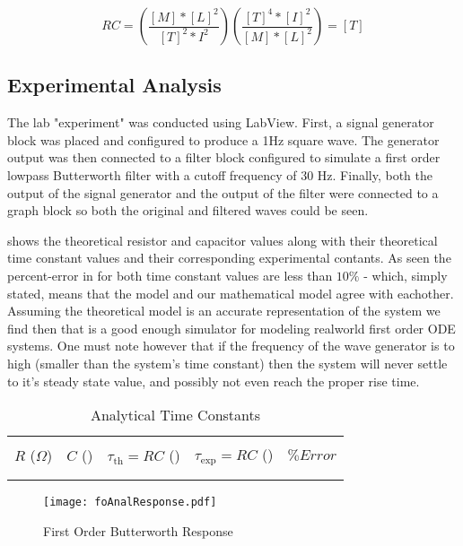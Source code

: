 \documentclass[main.tex]{subfile}
\begin{document}
	\[RC = (\frac{[M] * [L]^2}{[T]^2 * I^2} )(\frac{[T]^4 * [I]^2}{[M] * [L]^2}) = [T]\]

\subsection{Experimental Analysis}

The lab "experiment" was conducted using LabView. First, a signal generator
block was placed and configured to produce a 1Hz square wave. The generator
output was then connected to a filter block configured to simulate a first order
lowpass Butterworth filter with a cutoff frequency of 30 Hz. Finally, both the
output of the signal generator and the output of the filter were connected to a
graph block so both the original and filtered waves could be seen.


 shows the theoretical resistor and capacitor values along
with their theoretical time constant values and their corresponding experimental
contants. As seen the percent-error in for both time constant values are less
than $10\%$ - which, simply stated, means that the \Labview model and our
mathematical model agree with eachother. Assuming the theoretical model is an
accurate representation of the system we find then that \Labview is a good
enough simulator for modeling realworld first order ODE systems. One must note
however that if the frequency of the wave generator is to high (smaller than the
system's time constant) then the system will never settle to it's steady state
value, and possibly not even reach the proper rise time.

\begin{table}[H]
  \begin{center}
		\caption{Analytical Time Constants}
		\label{tab:fo_a_taus}
		\begin{tabular}{ccccc}
      \\ \toprule
			\\ $R$ ($\Omega$) & $C$ (\dem{mF}) & $\tau_{\text{th}} = RC$ (\dem{s}) & $\tau_{\text{exp}} = RC$ (\dem{s}) & $\%Error$
      \\ \midrule
			\\ 
      \\ \bottomrule
    \end{tabular}
  \end{center}
\end{table}

\begin{figure}[H]
	\begin{center}
		\texttt{[image: foAnalResponse.pdf]}
	\end{center}
	\caption{First Order Butterworth Response}
	\label{fig:foGraph}
\end{figure}


\end{document}
